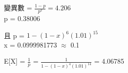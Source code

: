 \documentclass{article}
\begin{document}
\fontsize{15pt}{20pt}\selectfont

\begin{CJK}{UTF8}{bsmi} %
\noindent
變異數 = $\frac{1-p}{p^{2}} = 4.206$\\
p = 0.38006

\noindent
且 p = $1-(1-x)^{6}(1.01)^{15}$\\
x = 0.0999981773 $\approx$ 0.1

\noindent
E[X] = $\frac{1}{p}$ = $\frac{1}{1-(1-x)^{4}(1.01)^{14}}$ = 4.06785\\

\end{CJK} %
\end{document}
